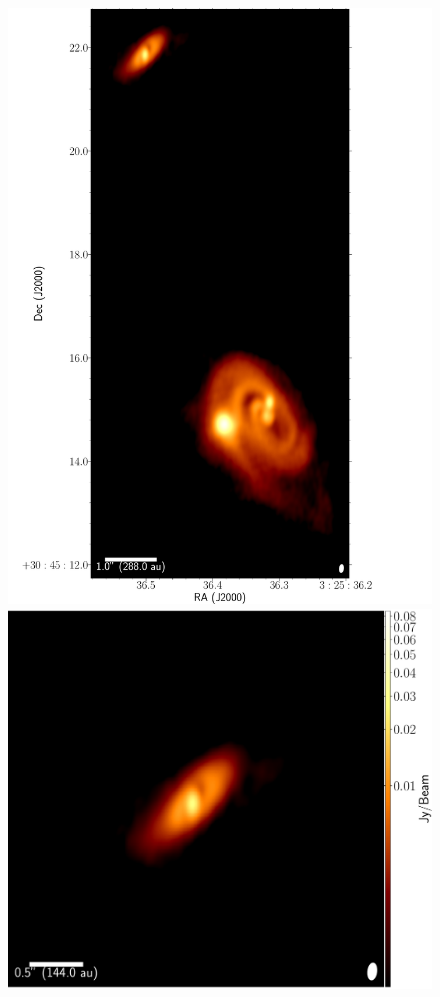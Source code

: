 \begin{figure}[H]
\begin{center}
 \begin{minipage}{0.49\textwidth}
  \includegraphics[width=\textwidth]{img/L1448IRS3B_cont_robust05all.pdf}
 \end{minipage}
 \begin{minipage}{0.49\textwidth}
  \vfill
  \includegraphics[width=\textwidth]{img/L1448IRS3B_cont_robust05single_uc.pdf}

\end{minipage}
\end{center}
\end{figure}
